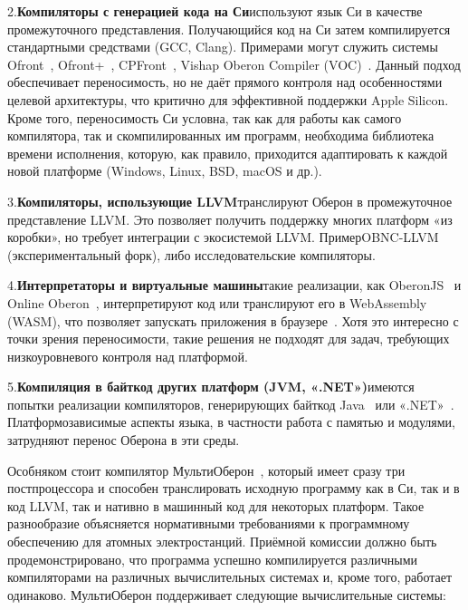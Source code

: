 \documentclass[utf8]{lgu}
\newcommand{\tire}{\unskip\nobreak\thinspace\textemdash\thinspace}
\begin{document}
2.\hspace{0.5em}\textbf{Компиляторы с генерацией кода на Си}\tire используют язык Си в качестве промежуточного представления. Получающийся код на Си затем компилируется стандартными средствами (GCC, Clang). Примерами могут служить системы Ofront~\cite{Ofront,OfrontGithub}, Ofront+~\cite{OfrontPlus,OfrontPlusETH}, CPFront~\cite{CPFront}, Vishap Oberon Compiler (VOC)~\cite{Voc, VocGithub}. Данный подход обеспечивает переносимость, но не даёт прямого контроля над особенностями целевой архитектуры, что критично для эффективной поддержки Apple Silicon. Кроме того, переносимость Си условна, так как для работы как самого компилятора, так и скомпилированных им программ, необходима библиотека времени исполнения, которую, как правило, приходится адаптировать к каждой новой платформе (Windows, Linux, BSD, macOS и др.).

3.\hspace{0.5em}\textbf{Компиляторы, использующие LLVM}\tire транслируют Оберон в промежуточное представление LLVM. Это позволяет получить поддержку многих платформ «из коробки», но требует интеграции с экосистемой LLVM. Пример\tire OBNC-LLVM (экспериментальный форк), либо исследовательские компиляторы.
  
4.\hspace{0.5em}\textbf{Интерпретаторы и виртуальные машины}\tire такие реализации, как OberonJS~\cite{OberonJS,OberonJSOnline} и Online Oberon~\cite{OberonOnline}, интерпретируют код или транслируют его в WebAssembly (WASM), что позволяет запускать приложения в браузере~\cite{ProjectOberonOnline}. Хотя это интересно с точки зрения переносимости, такие решения не подходят для задач, требующих низкоуровневого контроля над платформой.

5.\hspace{0.5em}\textbf{Компиляция в байткод других платформ (JVM, «.NET»)}\tire имеются попытки реализации компиляторов, генерирующих байткод Java~\cite{OberonNC} или «.NET»~\cite{GPCP}. Платформозависимые аспекты языка, в частности работа с памятью и модулями, затрудняют перенос Оберона в эти среды.

Особняком стоит компилятор МультиОберон~\cite{MultiOberon,MultiOberonGuide}, который имеет сразу три постпроцессора и способен транслировать исходную программу как в Си, так и в код LLVM, так и нативно в машинный код для некоторых платформ. Такое разнообразие объясняется нормативными требованиями к программному обеспечению для атомных электростанций. Приёмной комиссии должно быть продемонстрировано, что программа успешно компилируется различными компиляторами на различных вычислительных системах и, кроме того, работает одинаково. МультиОберон поддерживает следующие вычислительные системы:
\end{document}
